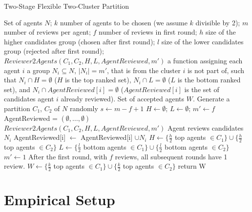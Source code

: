\documentclass[letterpaper]{article} %
\begin{document}
\begin{algorithm}[t]
\small
\caption{Two-Stage Flexible Two-Cluster Partition}\label{2StageFlexPartition}
\begin{algorithmic}[1]
\Require
Set of agents $N$; %
$k$ number of agents to be chosen (we assume $k$ divisible by 2);
\newline
$m$ number of reviews per agent;
\newline
$f$ number of reviews in first round;
\newline
$h$ size of the higher candidates group (chosen after first round);
\newline
$l$ size of the lower candidates group (rejected after first round);
\newline
$Reviewer2Agents(C_{1},C_{2},H,L,AgentReviewed,m')$ a function assigning each agent $i$ a group $N_{i}\subseteq N$, $|N_{i}|=m'$, that is from the cluster $i$ is not part of, such that $N_{i}\cap H=\emptyset$ ($H$ is the top ranked set), $N_{i}\cap L=\emptyset$ ($L$ is the bottom ranked set), and $N_{i}\cap AgentReviewed[i]=\emptyset$ ($AgentReviewed[i]$ is the set of candidates agent $i$ already reviewed).
\newline
\Ensure Set of accepted agents $W$.
\State Generate a partition {$C_{1}$, $C_{2}$} of $N$ randomly
\State $s \gets m - f + 1$ 
\State $H \gets \emptyset$; 
\State $L \gets \emptyset$; 
\State $m' \gets f$ 
\State AgentReviewed = $(\emptyset , \ldots , \emptyset)$
\State $Reviewer2Agents(C_{1},C_{2},H,L,AgentReviewed,m')$
\State Agent reviews candidates $N_{i}$ %
\State AgentReviewed[i] $\gets$ AgentReviewed[i] $\cup N_{i}$
\EndFor
\State $H \gets \{ \frac{h}{2}$ top agents $\in C_{1} \} \cup \{ \frac{h}{2}$ top agents $\in C_{2} \}$
\State $L \gets \{\frac{l}{2}$ bottom agents $\in C_{1} \} \cup \{ \frac{l}{2}$ bottom agents $\in C_{2} \}$
\State $m' \gets1$ \Comment After the first round, with $f$ reviews, all subsequent rounds have 1 review.
\EndFor
\State $W \gets \{ \frac{k}{2}$ top agents $\in C_{1} \} \cup \{ \frac{k}{2}$ top agents $\in C_{2} \}$
\State return W
\end{algorithmic}
\end{algorithm}
\normalsize

\section{Empirical Setup}\label{setup}
\end{document}

